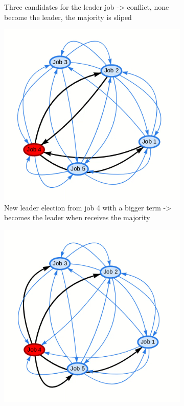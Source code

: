 \documentclass{eplmastersthesis}
\begin{document}
\begin{figure}[H]
\begin{subfigure}{.45\textwidth}
            \caption{Three candidates for the leader job -> conflict, none become the leader, the majority is sliped}
            \label{fig:ele2}
          \end{subfigure}
          \begin{subfigure}{.45\textwidth}
            \centering
            \includegraphics[width=1.0\linewidth]{figures/user_case/election_3.png}
            \caption{New leader election from job 4 with a bigger term -> becomes the leader when receives the majority}
            \label{fig:ele3}
          \end{subfigure}\hspace{0.1\textwidth}
          \begin{subfigure}{.45\textwidth}
            \centering
            \includegraphics[width=1.0\linewidth]{figures/user_case/election_4.png}

\end{subfigure}
\end{figure}
\end{document}
